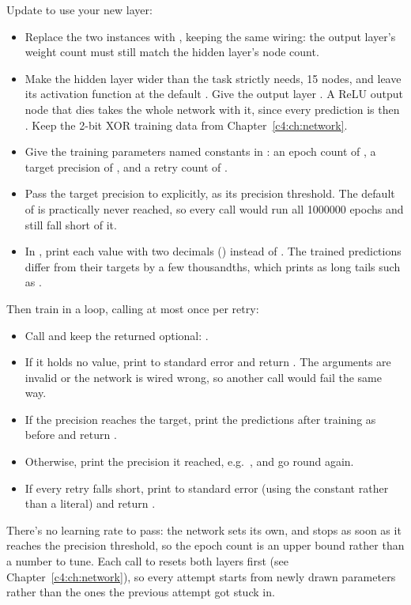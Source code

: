 \label{c5:ex:16}
Update  to use your new layer:
\begin{itemize}
  \item Replace the two  instances with ,
    keeping the same wiring: the output layer's weight count must still match the hidden layer's
    node count.
  \item Make the hidden layer wider than the task strictly needs, 15 nodes, and leave its
    activation function at the default . Give the output layer
    . A ReLU output node that dies takes the whole network with it, since every
    prediction is then . Keep the 2-bit XOR training data from
    Chapter~\ref{c4:ch:network}.
  \item Give the training parameters named constants in : an epoch count of
    , a target precision of , and a retry count of .
  \item Pass the target precision to  explicitly, as its precision threshold. The
    default of  is practically never reached, so every call would run all 1000000
    epochs and still fall short of it.
  \item In , print each value with two decimals () instead of
    . The trained predictions differ from their targets by a few thousandths, which
     prints as long tails such as .
\end{itemize}
Then train in a loop, calling  at most once per retry:
\begin{itemize}
  \item Call  and keep the returned optional:
    .
  \item If it holds no value, print  to standard error and return
    . The arguments are invalid or the network is wired wrong, so another call would
    fail the same way.
  \item If the precision reaches the target, print the predictions after training as before and
    return .
  \item Otherwise, print the precision it reached, e.g.\
    , and go round again.
  \item If every retry falls short, print  to
    standard error (using the constant rather than a literal) and return \code{false}.
\end{itemize}
There's no learning rate to pass: the network sets its own, and stops as soon as it reaches the
precision threshold, so the epoch count is an upper bound rather than a number to tune. Each call to
\code{train()} resets both layers first (see Chapter~\ref{c4:ch:network}), so every attempt starts
from newly drawn parameters rather than the ones the previous attempt got stuck in.

